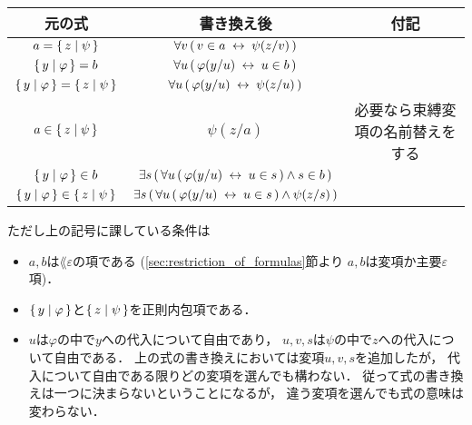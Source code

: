 	\begin{table}[H]
		\begin{center}
		\begin{tabular}{c|c|c}
			元の式 & 書き換え後 & 付記 \\ \hline \hline
			$a = \{\, z \mid \psi\, \}$ & $\forall v\, (\, v \in a \hspace{0.25em}\leftrightarrow\hspace{0.25em} \psi(z/v)\, )$ & \\ \hline
			$\{\, y \mid \varphi\, \} = b$ & $\forall u\, (\, \varphi(y/u) \hspace{0.25em}\leftrightarrow\hspace{0.25em} u \in b\, )$ & \\ \hline
			$\{\, y \mid \varphi\, \} = \{\, z \mid \psi\, \}$ & $\forall u\, (\, \varphi(y/u) \hspace{0.25em}\leftrightarrow\hspace{0.25em} \psi(z/u)\, )$ & \\ \hline
			$a \in \{\, z \mid \psi\, \}$ & $\psi(z/a)$ & 必要なら束縛変項の名前替えをする\footnotemark \\ \hline
			$\{\, y \mid \varphi\, \} \in b$ & $\exists s\, (\, \forall u\, (\, \varphi(y/u) \hspace{0.25em}\leftrightarrow\hspace{0.25em} u \in s\, ) \wedge s \in b\, )$ & \\ \hline
			$\{\, y \mid \varphi\, \} \in \{\, z \mid \psi\, \}$ & $\exists s\, (\, \forall u\, (\, \varphi(y/u) \hspace{0.25em}\leftrightarrow\hspace{0.25em} u \in s\, ) \wedge \psi(z/s)\, )$ & \\ \hline
		\end{tabular}
		\end{center}
	\end{table}
	
	ただし上の記号に課している条件は
	\begin{itemize}
		\item $a,b$は$\lang{\varepsilon}$の項である
			(\ref{sec:restriction_of_formulas}節より
			$a,b$は変項か主要$\varepsilon$項)．
		\item $\{\, y \mid \varphi\, \}$と$\{\, z \mid \psi\, \}$を正則内包項である．
		\item $u$は$\varphi$の中で$y$への代入について自由であり，
			$u,v,s$は$\psi$の中で$z$への代入について自由である．
			上の式の書き換えにおいては変項$u,v,s$を追加したが，
			代入について自由である限りどの変項を選んでも構わない．
			従って式の書き換えは一つに決まらないということになるが，
			違う変項を選んでも式の意味は変わらない．
	\end{itemize}
	
	
